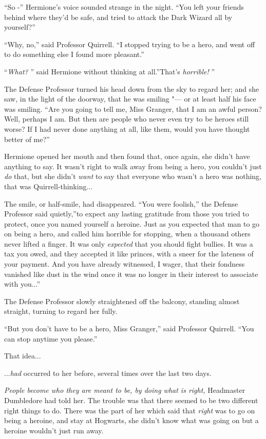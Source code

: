 ``So -'' Hermione's voice sounded strange in the night. ``You left your
friends behind where they'd be safe, and tried to attack the Dark Wizard
all by yourself?''

``Why, no,'' said Professor Quirrell. ``I stopped trying to be a hero,
and went off to do something else I found more pleasant.''

``\emph{What?} '' said Hermione without thinking at all.''That's
\emph{horrible!} ''

The Defense Professor turned his head down from the sky to regard her;
and she saw, in the light of the doorway, that he was smiling "--- or at
least half his face was smiling. ``Are you going to tell me, Miss
Granger, that I am an awful person? Well, perhaps I am. But then are
people who never even try to be heroes still worse? If I had never done
anything at all, like them, would you have thought better of me?''

Hermione opened her mouth and then found that, once again, she didn't
have anything to say. It wasn't right to walk away from being a hero,
you couldn't just \emph{do} that, but she didn't \emph{want} to say that
everyone who wasn't a hero was nothing, that was
Quirrell-thinking...

The smile, or half-smile, had disappeared. ``You were foolish,'' the
Defense Professor said quietly,''to expect any lasting gratitude from
those you tried to protect, once you named yourself a heroine. Just as
you expected that man to go on being a hero, and called him horrible for
stopping, when a thousand others never lifted a finger. It was only
\emph{expected} that you should fight bullies. It was a tax you owed,
and they accepted it like princes, with a sneer for the lateness of your
payment. And you have already witnessed, I wager, that their fondness
vanished like dust in the wind once it was no longer in their interest
to associate with you...''

The Defense Professor slowly straightened off the balcony, standing
almost straight, turning to regard her fully.

``But you don't have to be a hero, Miss Granger,'' said Professor
Quirrell. ``You can stop anytime you please.''

That idea...

...\emph{had} occurred to her before, several times over the last
two days.

\emph{People become who they are meant to be, by doing what is right,}
Headmaster Dumbledore had told her. The trouble was that there seemed to
be two different right things to do. There was the part of her which
said that \emph{right} was to go on being a heroine, and stay at
Hogwarts, she didn't know what was going on but a heroine wouldn't just
run away.

